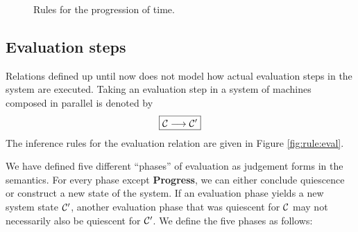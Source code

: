 \begin{figure}[!ht]
\caption{Rules for the progression of time.}\label{fig:rule:progress}
\end{figure}

\subsection{Evaluation steps}

Relations defined up until now does not model how actual evaluation steps in the
system are executed. Taking an evaluation step in a system of machines composed
in parallel is denoted by
\begin{equation*}
\boxed{\mathcal{C} \longrightarrow \mathcal{C}'}
\end{equation*}
The inference rules for the evaluation relation are given in Figure
\ref{fig:rule:eval}.

We have defined five different ``phases'' of evaluation as judgement forms in
the semantics. For every phase except \textbf{Progress}, we can either conclude
quiescence or construct a new state of the system. If an evaluation phase yields
a new system state $\mathcal{C}'$, another evaluation phase that was quiescent for $\mathcal{C}$
may not necessarily also be quiescent for $\mathcal{C}'$. We define the five phases as
follows:

